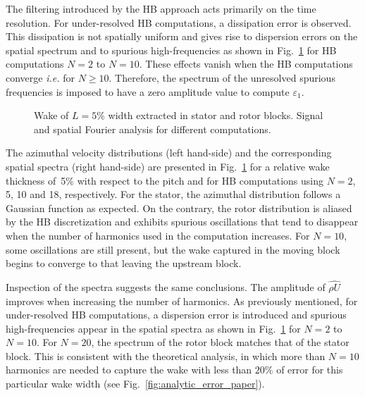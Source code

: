 The filtering introduced by the HB approach 
acts primarily on the time resolution. 
For under-resolved HB computations, a dissipation error is observed.
This dissipation is not spatially uniform and gives rise to
dispersion errors on the spatial spectrum and to spurious
high-frequencies as shown in 
Fig.~\ref{fig:spatial_crit} for HB computations $N=2$ to $N=10$.
These effects vanish when the HB computations converge
\emph{i.e.} for $N \geq 10$.
Therefore, the spectrum of the unresolved spurious frequencies 
is imposed to have a zero amplitude value to compute
$\varepsilon_1$.
\begin{figure}[htb]
  \centering
  \caption{Wake of $L=5\%$ width extracted in stator and rotor 
  blocks. Signal and spatial Fourier analysis for different computations.}
  \label{fig:spatial_crit}
\end{figure}

The azimuthal velocity distributions (left hand-side) and the corresponding spatial
spectra (right hand-side)
are presented in Fig.~\ref{fig:spatial_crit} 
for a relative wake thickness of~5\% with respect to the pitch 
and for HB computations using $N=2$, 5, 10 and 18, respectively.
For the stator, the azimuthal distribution follows a 
Gaussian function as expected. On the contrary, 
the rotor distribution is aliased by the HB discretization 
and exhibits spurious oscillations that tend to disappear
when the number of harmonics used in the computation 
increases.
For $N=10$, some oscillations are still present, 
but the wake captured in the moving block begins to 
converge to that leaving the upstream block.

Inspection of the spectra suggests the same conclusions.
The amplitude of $\widehat{\rho U}$ 
improves when increasing the number of harmonics.
As previously mentioned, for under-resolved HB computations,
a dispersion error is introduced and spurious high-frequencies appear 
in the spatial spectra as shown in Fig.~\ref{fig:spatial_crit}
for $N=2$ to $N=10$.
For $N=20$, the spectrum of the rotor 
block matches that of the stator block.
This is consistent with the theoretical analysis, in which more than 
$N=10$ harmonics are needed to capture the wake with less than $20\%$ 
of error for this particular
wake width (see Fig.~\ref{fig:analytic_error_paper}).

